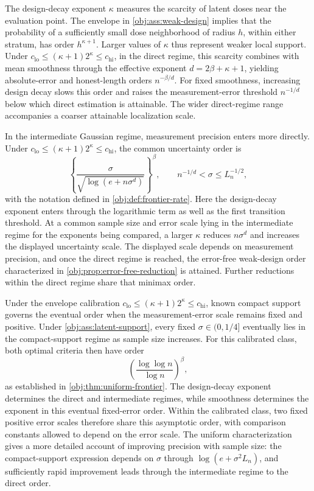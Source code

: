 \documentclass[11pt]{article}
\begin{document}
The design-decay exponent \(\kappa\) measures the scarcity of latent doses near the evaluation point. The envelope in \cref{obj:ass:weak-design} implies that the probability of a sufficiently small dose neighborhood of radius \(h\), within either stratum, has order \(h^{\kappa+1}\). Larger values of \(\kappa\) thus represent weaker local support. Under \(c_{\mathrm{lo}}\le(\kappa+1)2^\kappa\le c_{\mathrm{hi}}\), in the direct regime, this scarcity combines with mean smoothness through the effective exponent \(d=2\beta+\kappa+1\), yielding absolute-error and honest-length orders \(n^{-\beta/d}\). For fixed smoothness, increasing design decay slows this order and raises the measurement-error threshold \(n^{-1/d}\) below which direct estimation is attainable. The wider direct-regime range accompanies a coarser attainable localization scale.

In the intermediate Gaussian regime, measurement precision enters more directly. Under \(c_{\mathrm{lo}}\le(\kappa+1)2^\kappa\le c_{\mathrm{hi}}\), the common uncertainty order is
\[
\left\{\frac{\sigma}{\sqrt{\log(e+n\sigma^d)}}\right\}^{\beta},
\qquad
n^{-1/d}<\sigma\le L_n^{-1/2},
\]
with the notation defined in \cref{obj:def:frontier-rate}. Here the design-decay exponent enters through the logarithmic term as well as the first transition threshold. At a common sample size and error scale lying in the intermediate regime for the exponents being compared, a larger \(\kappa\) reduces \(n\sigma^d\) and increases the displayed uncertainty scale. The displayed scale depends on measurement precision, and once the direct regime is reached, the error-free weak-design order characterized in \cref{obj:prop:error-free-reduction} is attained. Further reductions within the direct regime share that minimax order.

Under the envelope calibration \(c_{\mathrm{lo}}\le(\kappa+1)2^\kappa\le c_{\mathrm{hi}}\), known compact support governs the eventual order when the measurement-error scale remains fixed and positive. Under \cref{obj:ass:latent-support}, every fixed \(\sigma\in(0,1/4]\) eventually lies in the compact-support regime as sample size increases. For this calibrated class, both optimal criteria then have order
\[
\left(\frac{\log\log n}{\log n}\right)^\beta,
\]
as established in \cref{obj:thm:uniform-frontier}. The design-decay exponent determines the direct and intermediate regimes, while smoothness determines the exponent in this eventual fixed-error order. Within the calibrated class, two fixed positive error scales therefore share this asymptotic order, with comparison constants allowed to depend on the error scale. The uniform characterization gives a more detailed account of improving precision with sample size: the compact-support expression depends on \(\sigma\) through \(\log(e+\sigma^2L_n)\), and sufficiently rapid improvement leads through the intermediate regime to the direct order.
\end{document}

